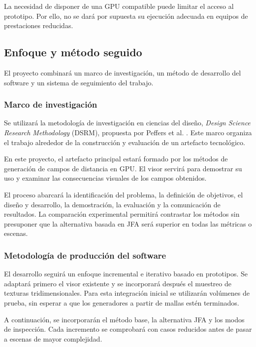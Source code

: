La necesidad de disponer de una GPU compatible puede limitar el acceso al prototipo. Por ello, no se dará por supuesta su ejecución adecuada en equipos de prestaciones reducidas.

\subsection{Enfoque y método seguido}

El proyecto combinará un marco de investigación, un método de desarrollo del software y un sistema de seguimiento del trabajo.

\subsubsection{Marco de investigación}

Se utilizará la metodología de investigación en ciencias del diseño, \textit{Design Science Research Methodology} (DSRM), propuesta por Peffers et al. \cite{peffers2007}. Este marco organiza el trabajo alrededor de la construcción y evaluación de un artefacto tecnológico.

En este proyecto, el artefacto principal estará formado por los métodos de generación de campos de distancia en GPU. El visor servirá para demostrar su uso y examinar las consecuencias visuales de los campos obtenidos.

El proceso abarcará la identificación del problema, la definición de objetivos, el diseño y desarrollo, la demostración, la evaluación y la comunicación de resultados. La comparación experimental permitirá contrastar los métodos sin presuponer que la alternativa basada en JFA será superior en todas las métricas o escenas.

\subsubsection{Metodología de producción del software}

El desarrollo seguirá un enfoque incremental e iterativo basado en prototipos. Se adaptará primero el visor existente y se incorporará después el muestreo de texturas tridimensionales. Para esta integración inicial se utilizarán volúmenes de prueba, sin esperar a que los generadores a partir de mallas estén terminados.

A continuación, se incorporarán el método base, la alternativa JFA y los modos de inspección. Cada incremento se comprobará con casos reducidos antes de pasar a escenas de mayor complejidad.


